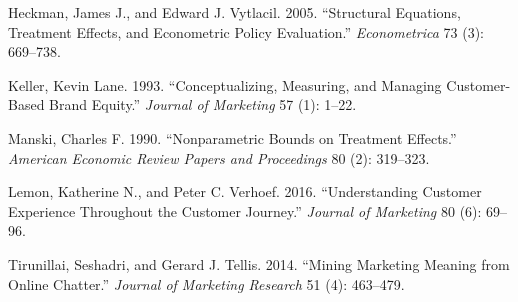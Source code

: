 \documentclass[11pt]{article}
\begin{document}
\noindent Heckman, James J., and Edward J. Vytlacil. 2005. ``Structural Equations, Treatment Effects, and Econometric Policy Evaluation.'' \textit{Econometrica} 73 (3): 669--738.

\noindent Keller, Kevin Lane. 1993. ``Conceptualizing, Measuring, and Managing Customer-Based Brand Equity.'' \textit{Journal of Marketing} 57 (1): 1--22.

\noindent Manski, Charles F. 1990. ``Nonparametric Bounds on Treatment Effects.'' \textit{American Economic Review Papers and Proceedings} 80 (2): 319--323.

\noindent Lemon, Katherine N., and Peter C. Verhoef. 2016. ``Understanding Customer Experience Throughout the Customer Journey.'' \textit{Journal of Marketing} 80 (6): 69--96.

\noindent Tirunillai, Seshadri, and Gerard J. Tellis. 2014. ``Mining Marketing Meaning from Online Chatter.'' \textit{Journal of Marketing Research} 51 (4): 463--479.
\end{document}
